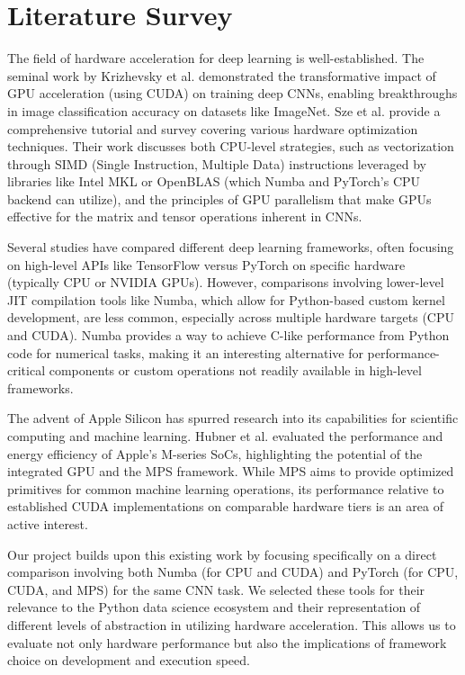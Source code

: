 \documentclass[conference]{IEEEtran} %
\begin{document}
\section{Literature Survey}
\label{sec:literature}
The field of hardware acceleration for deep learning is well-established. The seminal work by Krizhevsky et al. \cite{Krizhevsky2012} demonstrated the transformative impact of GPU acceleration (using CUDA) on training deep CNNs, enabling breakthroughs in image classification accuracy on datasets like ImageNet. Sze et al. \cite{Sze2017} provide a comprehensive tutorial and survey covering various hardware optimization techniques. Their work discusses both CPU-level strategies, such as vectorization through SIMD (Single Instruction, Multiple Data) instructions leveraged by libraries like Intel MKL or OpenBLAS (which Numba and PyTorch's CPU backend can utilize), and the principles of GPU parallelism that make GPUs effective for the matrix and tensor operations inherent in CNNs.

Several studies have compared different deep learning frameworks, often focusing on high-level APIs like TensorFlow versus PyTorch on specific hardware (typically CPU or NVIDIA GPUs). However, comparisons involving lower-level JIT compilation tools like Numba, which allow for Python-based custom kernel development, are less common, especially across multiple hardware targets (CPU and CUDA). Numba provides a way to achieve C-like performance from Python code for numerical tasks, making it an interesting alternative for performance-critical components or custom operations not readily available in high-level frameworks.

The advent of Apple Silicon has spurred research into its capabilities for scientific computing and machine learning. Hubner et al. \cite{Hubner2025} evaluated the performance and energy efficiency of Apple's M-series SoCs, highlighting the potential of the integrated GPU and the MPS framework. While MPS aims to provide optimized primitives for common machine learning operations, its performance relative to established CUDA implementations on comparable hardware tiers is an area of active interest.

Our project builds upon this existing work by focusing specifically on a direct comparison involving both Numba (for CPU and CUDA) and PyTorch (for CPU, CUDA, and MPS) for the same CNN task. We selected these tools for their relevance to the Python data science ecosystem and their representation of different levels of abstraction in utilizing hardware acceleration. This allows us to evaluate not only hardware performance but also the implications of framework choice on development and execution speed.
\end{document}
